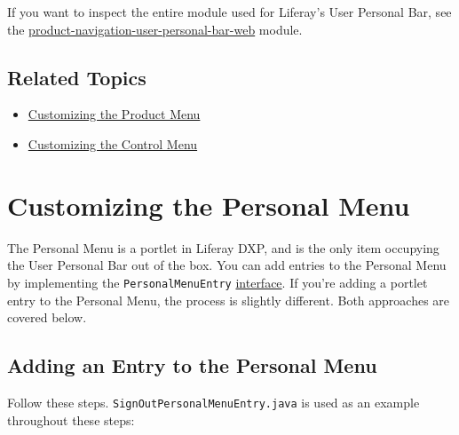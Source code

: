 If you want to inspect the entire module used for Liferay's User
Personal Bar, see the
\href{https://github.com/liferay/liferay-portal/tree/7.2.0-ga1/modules/apps/product-navigation/product-navigation-user-personal-bar-web}{product-navigation-user-personal-bar-web}
module.

\section{Related Topics}\label{related-topics-35}

\begin{itemize}
\tightlist
\item
  \href{/docs/7-2/customization/-/knowledge_base/c/customizing-the-product-menu}{Customizing
  the Product Menu}
\item
  \href{/docs/7-2/customization/-/knowledge_base/c/customizing-the-control-menu}{Customizing
  the Control Menu}
\end{itemize}

\chapter{Customizing the Personal
Menu}\label{customizing-the-personal-menu}

The Personal Menu is a portlet in Liferay DXP, and is the only item
occupying the User Personal Bar out of the box. You can add entries to
the Personal Menu by implementing the \texttt{PersonalMenuEntry}
\href{https://github.com/liferay/liferay-portal/blob/7.2.0-ga1/modules/apps/product-navigation/product-navigation-personal-menu-api/src/main/java/com/liferay/product/navigation/personal/menu/PersonalMenuEntry.java}{interface}.
If you're adding a portlet entry to the Personal Menu, the process is
slightly different. Both approaches are covered below.

\section{Adding an Entry to the Personal
Menu}\label{adding-an-entry-to-the-personal-menu}

Follow these steps. \texttt{SignOutPersonalMenuEntry.java} is used as an
example throughout these steps:

